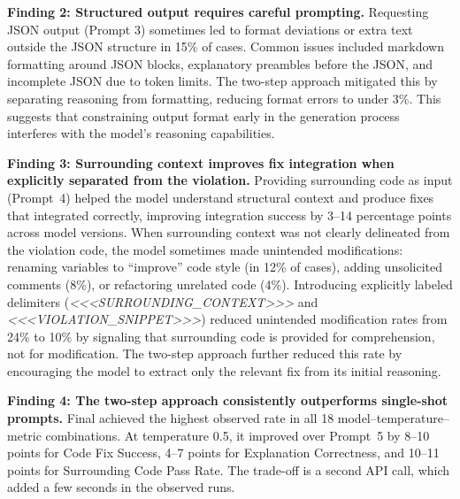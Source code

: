 \textbf{Finding 2: Structured output requires careful prompting.} Requesting JSON output (Prompt 3) sometimes led to format deviations or extra text outside the JSON structure in 15\% of cases. Common issues included markdown formatting around JSON blocks, explanatory preambles before the JSON, and incomplete JSON due to token limits. The two-step approach mitigated this by separating reasoning from formatting, reducing format errors to under 3\%. This suggests that constraining output format early in the generation process interferes with the model's reasoning capabilities.

\textbf{Finding 3: Surrounding context improves fix integration when 
explicitly separated from the violation.} Providing surrounding code 
as input (Prompt~4) helped the model understand structural context and 
produce fixes that integrated correctly, improving integration success 
by 3--14 percentage points across model versions. When 
surrounding context was not clearly delineated from the violation 
code, the model sometimes made unintended modifications: renaming 
variables to ``improve'' code style (in 12\% of cases), adding 
unsolicited comments (8\%), or refactoring unrelated code (4\%). 
Introducing explicitly labeled delimiters 
(\textit{<<<SURROUNDING\_CONTEXT>>>} and 
\textit{<<<VIOLATION\_SNIPPET>>>}) reduced unintended modification 
rates from 24\% to 10\% by signaling that surrounding code is 
provided for comprehension, not for modification. The two-step 
approach further reduced this rate by encouraging the model to 
extract only the relevant fix from its initial reasoning.



\textbf{Finding 4: The two-step approach consistently outperforms
single-shot prompts.} Final achieved the highest observed rate in all
18 model--temperature--metric combinations. At temperature 0.5, it
improved over Prompt~5 by 8--10 points for Code Fix Success, 4--7
points for Explanation Correctness, and 10--11 points for Surrounding
Code Pass Rate. The trade-off is a second API call, which added a few
seconds in the observed runs.

